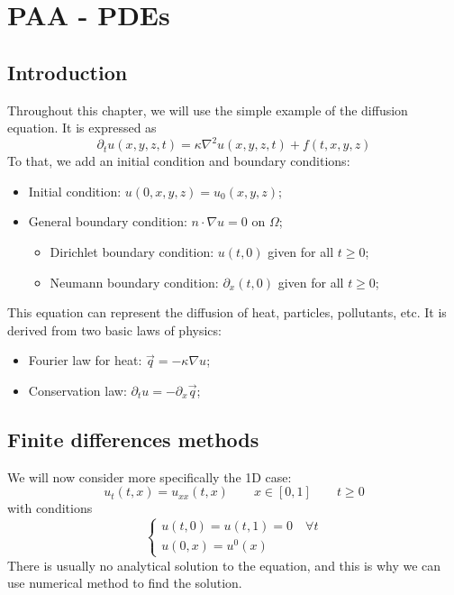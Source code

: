 \documentclass[12pt, openany]{report}
\theoremstyle{definition}
\begin{document}
\chapter{PAA - PDEs}
\section{Introduction}
Throughout this chapter, we will use the simple example of the diffusion equation. It is expressed as 
\begin{equation}
	\partial_t u(x,y,z,t) = \kappa \nabla^2 u(x,y,z,t) + f(t,x,y,z)
\end{equation}
To that, we add an initial condition and boundary conditions:
\begin{itemize}
	\item Initial condition: $u(0,x,y,z) = u_0(x,y,z)$;
	\item General boundary condition: $ n\cdot \nabla u=0$ on $\Omega$;
	\begin{itemize}
		\item Dirichlet boundary condition: $u(t,0)$ given for all $t\ge0$;
		\item Neumann boundary condition: $\partial_x(t,0)$ given for all $t\ge0$;
	\end{itemize}
\end{itemize}
This equation can represent the diffusion of heat, particles, pollutants, etc. It is derived from two basic laws of physics:
\begin{itemize}
	\item Fourier law for heat: $\vec q=-\kappa \nabla u$;
	\item Conservation law: $\partial_t u = -\partial_x \vec q$;
\end{itemize}
\section{Finite differences methods}
We will now consider more specifically the 1D case:
\begin{equation}
	u_t(t,x)=u_{xx}(t,x) \qquad x\in [0,1]\qquad t\ge 0
\end{equation}
with conditions 
\begin{equation}
	\begin{cases}
		u(t,0)=u(t,1) = 0 \quad \forall t\\
		u(0,x) = u^0(x)
	\end{cases}
\end{equation}
There is usually no analytical solution to the equation, and this is why we can use numerical method to find the solution. 
\end{document}
